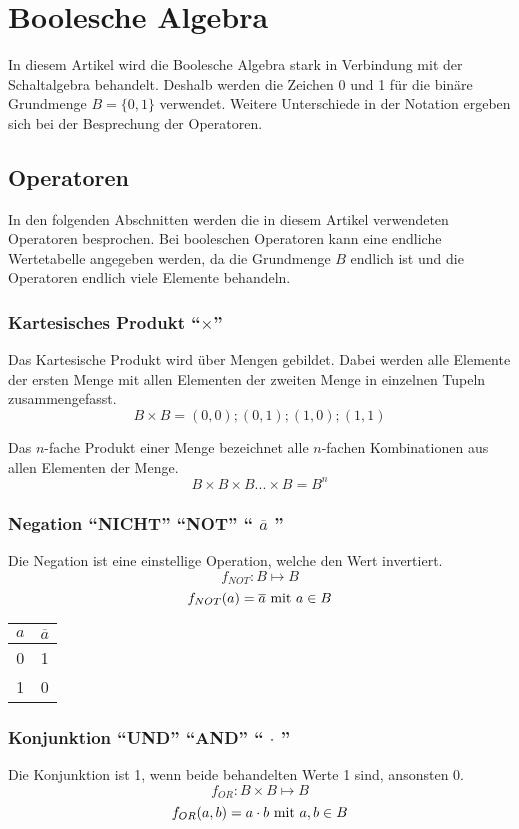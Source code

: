 \chapter{Boolesche Algebra}
In diesem Artikel wird die Boolesche Algebra stark in Verbindung mit der Schaltalgebra behandelt. Deshalb werden die Zeichen 0 und 1 für die binäre Grundmenge $B = \{0,1\}$ verwendet. Weitere Unterschiede in der Notation ergeben sich bei der Besprechung der Operatoren.

\section{Operatoren}
In den folgenden Abschnitten werden die in diesem Artikel verwendeten Operatoren besprochen. Bei booleschen Operatoren kann eine endliche Wertetabelle angegeben werden, da die Grundmenge $B$ endlich ist und die Operatoren endlich viele Elemente behandeln.

\subsection{Kartesisches Produkt "`$\times$"'}
Das Kartesische Produkt wird über Mengen gebildet. Dabei werden alle Elemente der ersten Menge mit allen Elementen der zweiten Menge in einzelnen Tupeln zusammengefasst.
$$ B \times B = (0,0); (0,1); (1,0); (1,1)$$

Das $n$-fache Produkt einer Menge bezeichnet alle $n$-fachen Kombinationen aus allen Elementen der Menge.
$$ B \times B  \times B ...  \times B = B^n$$

\subsection{Negation "`NICHT"' "`NOT"' "` $\overline{a}$ "'}
Die Negation ist eine einstellige Operation, welche den Wert invertiert.
$$ f_{NOT}: B \mapsto B $$
$$ f_{NOT}(a) = \overline{a} \textnormal{ mit } a \in B$$

\begin{center}
\begin{tabular}{cc}
	$a$ & $\overline a$ \\ \hline
	0  & 1           \\
	1  & 0           \\
\end{tabular}
\end{center}

\subsection{Konjunktion "`UND"' "`AND"' "` $\cdot$ "'}
Die Konjunktion ist 1, wenn beide behandelten Werte 1 sind, ansonsten 0.
$$ f_{OR}: B \times B \mapsto B $$
$$ f_{OR}(a, b) = a \cdot b \textnormal{ mit } a, b \in B$$

